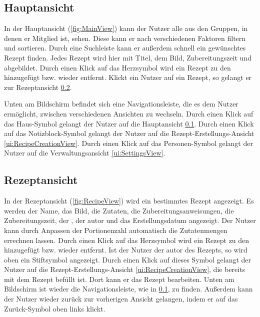\documentclass[parskip=full]{scrartcl}
\begin{document}
\subsection{Hauptansicht}
\label{ui:MainView}
In der Hauptansicht (\autoref{fig:MainView}) kann der Nutzer alle  aus den Gruppen, in denen er Mitglied ist, sehen. Diese kann er nach verschiedenen Faktoren filtern und sortieren. Durch eine Suchleiste kann er außerdem schnell ein gewünschtes Rezept finden. Jedes Rezept wird hier mit Titel, dem Bild, Zubereitungszeit und  abgebildet. Durch einen Klick auf das Herzsymbol wird ein Rezept zu den  hinzugefügt bzw. wieder entfernt. Klickt ein Nutzer auf ein Rezept, so gelangt er zur Rezeptansicht \ref{ui:RecipeView}.

Unten am Bildschirm befindet sich eine Navigationsleiste, die es dem Nutzer ermöglicht, zwischen verschiedenen Ansichten zu wechseln. Durch einen Klick auf das Haus-Symbol gelangt der Nutzer auf die Hauptansicht \ref{ui:MainView}. Durch einen Klick auf das Notizblock-Symbol gelangt der Nutzer auf die Rezept-Erstellungs-Ansicht \ref{ui:RecipeCreationView}. Durch einen Klick auf das Personen-Symbol gelangt der Nutzer auf die Verwaltungsansicht \ref{ui:SettingsView}.

\subsection{Rezeptansicht}
\label{ui:RecipeView}

In der Rezeptansicht (\autoref{fig:RecipeView}) wird ein bestimmtes Rezept angezeigt. Es werden der Name, das Bild, die Zutaten, die Zubereitungsanweisungen, die Zubereitungszeit, der , der \gls{autor} und das Erstellungsdatum angezeigt. Der Nutzer kann durch Anpassen der Portionenzahl automatisch die Zutatenmengen errechnen lassen. Durch einen Klick auf das Herzsymbol wird ein Rezept zu den  hinzugefügt bzw. wieder entfernt. Ist der Nutzer der \gls{autor} des Rezepts, so wird oben ein Stiftsymbol angezeigt. Durch einen Klick auf dieses Symbol gelangt der Nutzer auf die Rezept-Erstellungs-Ansicht \ref{ui:RecipeCreationView}, die bereits mit dem Rezept befüllt ist. Dort kann er das Rezept bearbeiten. Unten am Bildschirm ist wieder die Navigationsleiste, wie in \ref{ui:MainView}, zu finden. Außerdem kann der Nutzer wieder zurück zur vorherigen Ansicht gelangen, indem er auf das Zurück-Symbol oben links klickt.
\end{document}
